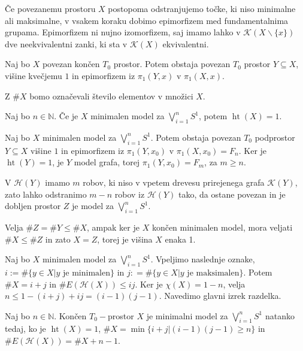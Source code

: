 \documentclass[mat1]{fmfdelo}
\DeclareRobustCommand{\h}{
    \mathcal{H}}
\DeclareMathOperator*{\htt}{ht}
\newcommand{\N}{\mathbb N}
\begin{document}
Če povezanemu prostoru $X$ postopoma odstranjujemo točke, ki niso minimalne ali maksimalne, v vsakem koraku dobimo epimorfizem med fundamentalnima grupama. Epimorfizem ni nujno izomorfizem, saj imamo lahko v $\mathcal{K}(X\backslash\{x\})$ dve neekvivalentni zanki, ki sta v $\mathcal{K}(X)$ ekvivalentni.



\begin{posledica}
    Naj bo $X$ povezan končen $T_0$ prostor. Potem obstaja povezan $T_0$ prostor $Y\subseteq X$, višine kvečjemu $1$ in epimorfizem iz $\pi_1(Y,x)$ v $\pi_1(X,x)$.
\end{posledica}
Z $\# X$ bomo označevali število elementov v množici $X$.

\begin{trditev}
    Naj bo $n\in\N$. Če je $X$ minimalen model za 
    $\bigvee\limits_{i=1}^{n}S^1$, potem $\htt(X)=1$.
\end{trditev}

\begin{dokaz}
    Naj bo $X$ minimalen model za $\bigvee\limits_{i=1}^{n}S^1$. Potem obstaja povezan $T_0$ podprostor $Y\subseteq X$ višine $1$ in epimorfizem iz $\pi_1(Y,x_0)$ v $\pi_1(X,x_0)=F_n$.
Ker je $\htt(Y)=1$, je $Y$ model grafa, torej $\pi_1(Y,x_0)=F_m$, za $m\geq n$.

    V $\h(Y)$ imamo $m$ robov, ki niso v vpetem drevesu prirejenega grafa $\mathcal{K}(Y)$, zato lahko odstranimo $m-n$ robov iz $\h(Y)$ tako, da ostane povezan in je dobljen prostor $Z$ je model za $\bigvee\limits_{i=1}^{n}S^1$.

    Velja $\#Z=\#Y\leq \#X$, ampak ker je $X$ končen minimalen model, mora veljati $\#X\leq\#Z$ in zato $X=Z$, torej je višina $X$ enaka 1.
\end{dokaz}

Naj bo $X$ minimalen model za $\bigvee\limits_{i=1}^{n}S^1$. Vpeljimo naslednje oznake, $i:=\#\{y\in X| y \text{ je minimalen}\}$ in $j\colon =\#\{y\in X| y \text{ je maksimalen}\}$. Potem $\#X=i+j$ in $\#E(\h(X))\leq ij$. Ker je $\chi(X)=1-n$, velja $n\leq 1 - (i+j) + ij=(i-1)(j-1)$. Navedimo glavni izrek razdelka.

\begin{izrek}
    Naj bo $n\in\N$. Končen $T_0-$prostor $X$ je minimalni model za  $\bigvee\limits_{i=1}^{n}S^1$ natanko tedaj, ko je $\htt(X)=1$, $\#X=\min\{i+j|(i-1)(j-1)\geq n\}$ in $\#E(\h(X))= \#X + n -1.$
\end{izrek}
\end{document}
